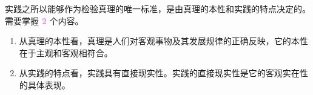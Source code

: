 \documentclass[UTF8]{ctexart}
\newcommand\Concept[1]{\colorbox{cyan!10!white}{\textcolor{cyan!40!black}{#1}}}
\newcommand\Emph[1]{\colorbox{violet!10}{\textcolor{violet}{\bfseries #1}}}
\newcommand\Example[1]{\textcolor{cyan!70!black}{\small #1}}
\newcommand\pos[1]{\hspace{0pt} \marginpar{\footnotesize\textcolor{yellow!50!black}{\hfill #1}}}
\begin{document}
\begin{description}[itemsep=0pt]
    \item[\Concept{实践作为检验真理唯一标准的原因}] \pos{p100} 实践之所以能够作为检验真理的唯一标准，是由真理的本性和实践的特点决定的。需要掌握 \Emph{2} 个内容。
    \Example{\begin{enumerate}[itemsep=0pt, parsep=0pt, leftmargin=15pt]
            \item 从真理的本性看，真理是人们对客观事物及其发展规律的正确反映，它的本性在于主观和客观相符合。
            \item 从实践的特点看，实践具有直接现实性。实践的直接现实性是它的客观实在性的具体表现。
        \end{enumerate}}
\end{description}

\BgThispage
\end{document}
